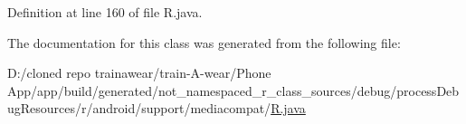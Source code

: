 Definition at line 160 of file R.\+java.



The documentation for this class was generated from the following file\+:\begin{DoxyCompactItemize}
\item 
D\+:/cloned repo trainawear/train-\/\+A-\/wear/\+Phone App/app/build/generated/not\+\_\+namespaced\+\_\+r\+\_\+class\+\_\+sources/debug/process\+Debug\+Resources/r/android/support/mediacompat/\mbox{\hyperlink{process_debug_resources_2r_2android_2support_2mediacompat_2_r_8java}{R.\+java}}\end{DoxyCompactItemize}
